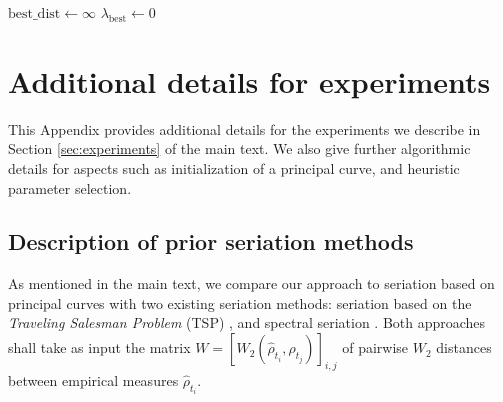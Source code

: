 \documentclass[aos, preprint]{imsart}
\theoremstyle{plain}
\theoremstyle{remark}
\begin{document}
\begin{appendix}
\begin{algorithm}[H]
    \BlankLine

    $\textrm{best\_dist} \gets \infty$\;
    $\lambda_\textrm{best} \gets 0$\;
    \BlankLine



\end{algorithm}

\section{Additional details for experiments}
\label{appn:extra-experiments}
This Appendix provides additional details for the experiments we describe in Section \ref{sec:experiments} of the main text. We also give further algorithmic details for aspects such as  initialization of a principal curve, and heuristic parameter selection.


\subsection*{Description of prior seriation methods}

As mentioned in the main text, we compare our approach to seriation based on principal curves with two existing seriation methods: seriation based on the \emph{Traveling Salesman Problem} (TSP) \cite{LAPORTE1978259_tsp_seriation}, and spectral seriation \cite{atkins_spectral_1998, spectral_seriation_fogel_alexandre, natik2021consistencyspectralseriation}. Both approaches shall take as input the matrix $W=[W_2(\hat\rho_{t_i}, \hat\rho_{t_j})]_{i,j}$ of pairwise $W_2$ distances between empirical measures $\hat\rho_{t_i}$.


\end{appendix}
\end{document}
